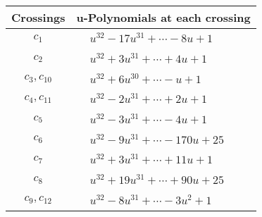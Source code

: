 \documentclass[1p]{elsarticle_modified}
\theoremstyle{definition}
\begin{document}
\begin{tabular}{m{50pt}|m{274pt}}
Crossings & \hspace{64pt}u-Polynomials at each crossing \\
\hline $$\begin{aligned}c_{1}\end{aligned}$$&$\begin{aligned}
&u^{32}-17 u^{31}+\cdots-8 u+1
\end{aligned}$\\
\hline $$\begin{aligned}c_{2}\end{aligned}$$&$\begin{aligned}
&u^{32}+3 u^{31}+\cdots+4 u+1
\end{aligned}$\\
\hline $$\begin{aligned}c_{3},c_{10}\end{aligned}$$&$\begin{aligned}
&u^{32}+6 u^{30}+\cdots- u+1
\end{aligned}$\\
\hline $$\begin{aligned}c_{4},c_{11}\end{aligned}$$&$\begin{aligned}
&u^{32}-2 u^{31}+\cdots+2 u+1
\end{aligned}$\\
\hline $$\begin{aligned}c_{5}\end{aligned}$$&$\begin{aligned}
&u^{32}-3 u^{31}+\cdots-4 u+1
\end{aligned}$\\
\hline $$\begin{aligned}c_{6}\end{aligned}$$&$\begin{aligned}
&u^{32}-9 u^{31}+\cdots-170 u+25
\end{aligned}$\\
\hline $$\begin{aligned}c_{7}\end{aligned}$$&$\begin{aligned}
&u^{32}+3 u^{31}+\cdots+11 u+1
\end{aligned}$\\
\hline $$\begin{aligned}c_{8}\end{aligned}$$&$\begin{aligned}
&u^{32}+19 u^{31}+\cdots+90 u+25
\end{aligned}$\\
\hline $$\begin{aligned}c_{9},c_{12}\end{aligned}$$&$\begin{aligned}
&u^{32}-8 u^{31}+\cdots-3 u^2+1
\end{aligned}$\\
\hline
\end{tabular}\\~\\
\end{document}
